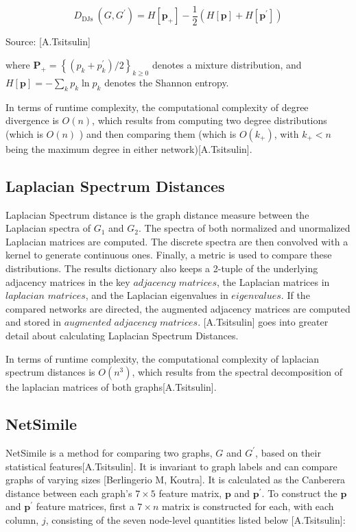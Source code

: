 \begin{equation}
D_{\text {DJs }}\left(G, G^{\prime}\right)=H\left[\mathbf{p}_{+}\right]-\frac{1}{2}\left(H[\mathbf{p}]+H\left[\mathbf{p}^{\prime}\right]\right)
\end{equation}
\caption{Source: [A.Tsitsulin]}

where $\mathbf{P}_{+}=\left\{\left(p_{k}+p_{k}^{\prime}\right) / 2\right\}_{k \geq 0}$ denotes a mixture distribution, and $H[\mathbf{p}]=-\sum_{k} p_{k} \ln p_{k}$ denotes the Shannon entropy. 

In terms of runtime complexity, the computational complexity of degree divergence is $O(n)$, which results from computing two degree distributions (which is $O(n)$ ) and then comparing them (which is $O\left(k_{+}\right)$, with $k_{+}<n$ being the maximum degree in either network)[A.Tsitsulin].

\subsection{Laplacian Spectrum Distances}
Laplacian Spectrum distance is the graph distance measure between the Laplacian spectra of $G_1$ and ${G_2}$. The spectra of both normalized and unormalized Laplacian matrices are computed. The discrete spectra are then convolved with a kernel to generate continuous ones. Finally, a metric is used to compare these distributions. The results dictionary also keeps a 2-tuple of the underlying adjacency matrices in the key $adjacency$ $matrices$, the Laplacian matrices in $laplacian$ $matrices$, and the Laplacian eigenvalues in $eigenvalues$. If the compared networks are directed, the augmented adjacency matrices are computed and stored in $augmented$ $adjacency$ $matrices$. [A.Tsitsulin] goes into greater detail about calculating Laplacian Spectrum Distances.

In terms of runtime complexity, the computational complexity of laplacian spectrum distances is $O(n^{3})$, which results from the spectral decomposition of the laplacian matrices of both graphs[A.Tsitsulin].

\subsection{NetSimile}
NetSimile is a method for comparing two graphs, $G$ and $G^{\prime}$, based on their statistical features[A.Tsitsulin]. It is invariant to graph labels and can compare graphs of varying sizes [Berlingerio M, Koutra]. It is calculated as the Canberera distance between each graph's $7 \times 5$ feature matrix, $\mathbf{p}$ and $\mathbf{p}^{\prime}$. To construct the $\mathbf{p}$ and $\mathbf{p}^{\prime}$ feature matrices, first a $7 \times n$ matrix is constructed for each, with each column, $j$, consisting of the seven node-level quantities listed below [A.Tsitsulin]:

